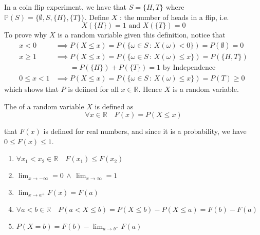 \documentclass[notoc,notitlepage]{tufte-book}
\begin{document}
\begin{eg}
  \label{eg:random_var_eg}
  In a coin flip experiment, we have that $S = \{H, T\}$ where $\mathbb{P}(S) = \{\emptyset, S, \{H\}, \{T\} \}$. Define $X$ : the number of heads in a flip, i.e.
  \begin{equation*}
    X(\{H\}) = 1 \text{ and } X(\{T\}) = 0
  \end{equation*}
  To prove why $X$ is a random variable given this definition, notice that
  \begin{align*}
    x < 0 &\implies P(X \leq x) = P(\{\omega \in S \, : \, X(\omega) < 0\}) = P(\emptyset) = 0 \\
    x \geq 1 &\implies P(X \leq x) = P(\{\omega \in S \, : \, X(\omega) \leq x\}) = P(\{H, T\}) \\
      & \qquad = P(\{H\}) + P(\{T\}) = 1 \text{ by Independence} \\
    0 \leq x < 1 &\implies P(X \leq x) = P(\{\omega \in S \, : \, X(\omega) \leq x\}) = P(T) \geq 0
  \end{align*}
  which shows that $P$ is deiined for all $x \in \mathbb{R}$. Hence $X$ is a random variable.
\end{eg}

\begin{defn}\label{defn:cumulative_distribution_function}
  The  of a random variable $X$ is defined as
  \begin{equation*}
    \forall x \in \mathbb{R} \quad F(x) = P(X \leq x)
  \end{equation*}
\end{defn}

\begin{note}
   that $F(x)$ is defined for  real numbers, and since it is a probability, we have $0 \leq F(x) \leq 1$.
\end{note}

\begin{propo}\label{propo:properties_of_the_cdf}
  \begin{enumerate}
    \item $\forall x_1 < x_2 \in \mathbb{R} \quad F(x_1) \leq F(x_2)$ 
    \item $\lim_{x \to -\infty} = 0 \, \land \, \lim_{x \to \infty} = 1$
    \item $\lim_{x \to a^+} F(x) = F(a)$ 
    \item $\forall a < b \in \mathbb{R} \quad P(a < X \leq b) = P(X \leq b) - P(X \leq a) = F(b) - F(a)$
    \item $P(X = b) = F(b) - \lim_{a \to b^-} F(a)$ 
  \end{enumerate}
\end{propo}
\end{document}
